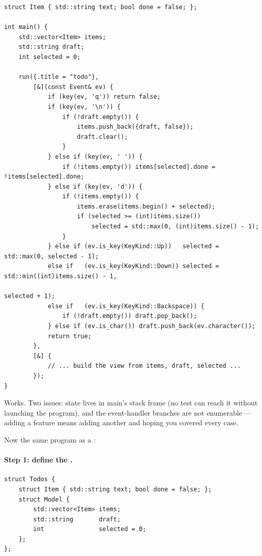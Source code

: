 \begin{lstlisting}
struct Item { std::string text; bool done = false; };

int main() {
    std::vector<Item> items;
    std::string draft;
    int selected = 0;

    run({.title = "todo"},
        [&](const Event& ev) {
            if (key(ev, 'q')) return false;
            if (key(ev, '\n')) {
                if (!draft.empty()) {
                    items.push_back({draft, false});
                    draft.clear();
                }
            } else if (key(ev, ' ')) {
                if (!items.empty()) items[selected].done = !items[selected].done;
            } else if (key(ev, 'd')) {
                if (!items.empty()) {
                    items.erase(items.begin() + selected);
                    if (selected >= (int)items.size())
                        selected = std::max(0, (int)items.size() - 1);
                }
            } else if (ev.is_key(KeyKind::Up))   selected = std::max(0, selected - 1);
            else if   (ev.is_key(KeyKind::Down)) selected = std::min((int)items.size() - 1,
                                                                    selected + 1);
            else if   (ev.is_key(KeyKind::Backspace)) {
                if (!draft.empty()) draft.pop_back();
            } else if (ev.is_char()) draft.push_back(ev.character());
            return true;
        },
        [&] {
            // ... build the view from items, draft, selected ...
        });
}
\end{lstlisting}

Works. Two issues: state lives in main's stack frame (no test can
reach it without launching the program), and the event-handler
branches are not enumerable --- adding a feature means adding
another  and hoping you covered every case.

Now the same program as a :

\paragraph{Step 1: define the .}

\begin{lstlisting}
struct Todos {
    struct Item { std::string text; bool done = false; };
    struct Model {
        std::vector<Item> items;
        std::string       draft;
        int               selected = 0;
    };
};
\end{lstlisting}

